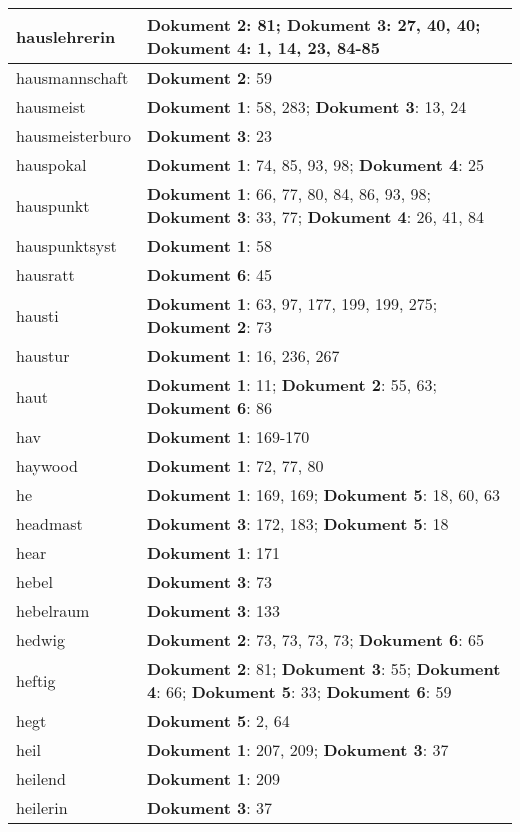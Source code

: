 \documentclass[a5paper]{article}
\begin{document}
\begin{longtable}[l]{|l|p{3in}|}
\hline
hauslehrerin & \textbf{Dokument 2}: 81; \textbf{Dokument 3}: 27, 40, 40; \textbf{Dokument 4}: 1, 14, 23, 84-85 \\
\hline
hausmannschaft & \textbf{Dokument 2}: 59 \\
\hline
hausmeist & \textbf{Dokument 1}: 58, 283; \textbf{Dokument 3}: 13, 24 \\
\hline
hausmeisterburo & \textbf{Dokument 3}: 23 \\
\hline
hauspokal & \textbf{Dokument 1}: 74, 85, 93, 98; \textbf{Dokument 4}: 25 \\
\hline
hauspunkt & \textbf{Dokument 1}: 66, 77, 80, 84, 86, 93, 98; \textbf{Dokument 3}: 33, 77; \textbf{Dokument 4}: 26, 41, 84 \\
\hline
hauspunktsyst & \textbf{Dokument 1}: 58 \\
\hline
hausratt & \textbf{Dokument 6}: 45 \\
\hline
hausti & \textbf{Dokument 1}: 63, 97, 177, 199, 199, 275; \textbf{Dokument 2}: 73 \\
\hline
haustur & \textbf{Dokument 1}: 16, 236, 267 \\
\hline
haut & \textbf{Dokument 1}: 11; \textbf{Dokument 2}: 55, 63; \textbf{Dokument 6}: 86 \\
\hline
hav & \textbf{Dokument 1}: 169-170 \\
\hline
haywood & \textbf{Dokument 1}: 72, 77, 80 \\
\hline
he & \textbf{Dokument 1}: 169, 169; \textbf{Dokument 5}: 18, 60, 63 \\
\hline
headmast & \textbf{Dokument 3}: 172, 183; \textbf{Dokument 5}: 18 \\
\hline
hear & \textbf{Dokument 1}: 171 \\
\hline
hebel & \textbf{Dokument 3}: 73 \\
\hline
hebelraum & \textbf{Dokument 3}: 133 \\
\hline
hedwig & \textbf{Dokument 2}: 73, 73, 73, 73; \textbf{Dokument 6}: 65 \\
\hline
heftig & \textbf{Dokument 2}: 81; \textbf{Dokument 3}: 55; \textbf{Dokument 4}: 66; \textbf{Dokument 5}: 33; \textbf{Dokument 6}: 59 \\
\hline
hegt & \textbf{Dokument 5}: 2, 64 \\
\hline
heil & \textbf{Dokument 1}: 207, 209; \textbf{Dokument 3}: 37 \\
\hline
heilend & \textbf{Dokument 1}: 209 \\
\hline
heilerin & \textbf{Dokument 3}: 37 \\

\end{longtable}
\end{document}

